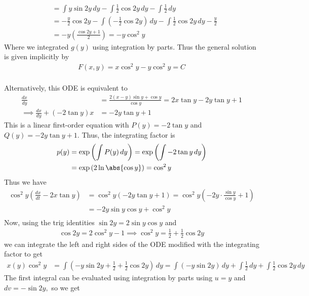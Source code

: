 \documentclass{article}
\begin{document}
\begin{enumerate}
\begin{soln}
\begin{align*}
				&= \int y\sin 2y\, dy - \int \frac{1}{2}\cos 2y\, dy - \int \frac{1}{2}\, dy \\
				&= -\frac{y}{2}\cos 2y - \int \left( -\frac{1}{2}\cos 2y \right)\, dy - \int \frac{1}{2}\cos 2y\, dy - \frac{y}{2} \\
				&= -y\left( \frac{\cos 2y + 1}{2} \right) = -y\cos^2 y
			\end{align*}
			Where we integrated $g(y)$ using integration by parts. Thus the general solution is given implicitly by
			\begin{align*}
				F(x, y) = \boxed{x\cos^2y - y\cos^2y = C} \\
			\end{align*}
			
			Alternatively, this ODE is equivalent to
			\begin{align*}
				\frac{dx}{dy} &= \frac{2(x-y)\sin y + \cos y}{\cos y} = 2x\tan y - 2y\tan y + 1 \\
				\implies \frac{dx}{dy} + (-2\tan y) x &= -2y\tan y + 1
			\end{align*}
			This is a linear first-order equation with $P(y)=-2\tan y$ and $Q(y) = -2y\tan y + 1.$ Thus, the integrating factor is
			\begin{align*}
				p(y) &= \exp\left( \int P(y)\, dy \right) = \exp\left( \int -2\tan y\, dy \right) \\ 
				&= \exp\left( 2\ln\abs{\cos y} \right)= \cos^2 y
			\end{align*}
			Thus we have
			\begin{align*}
				\cos^2 y \left( \frac{dx}{dt} -2x\tan y \right) &= \cos^2y \left( -2y\tan y+ 1 \right) = \cos^2y \left( -2y\cdot \frac{\sin y}{\cos y} + 1 \right) \\
				&= -2y\sin y\cos y + \cos^2y \\
			\end{align*}
			Now, using the trig identities $\sin 2y = 2\sin y\cos y$ and
			\begin{align*}
				\cos 2y = 2\cos^2y - 1 \implies \cos^2y = \frac{1}{2} + \frac{1}{2}\cos 2y
			\end{align*}
			we can integrate the left and right sides of the ODE modified with the integrating factor to get
			\begin{align*}
				x(y) \cos^2y &= \int\left( -y\sin 2y + \frac{1}{2} + \frac{1}{2}\cos 2y \right)\, dy = \int\left( -y\sin 2y \right)\, dy + \int \frac{1}{2}\, dy + \int \frac{1}{2}\cos 2y\, dy
			\end{align*}
			The first integral can be evaluated using integration by parts using $u=y$ and $dv=-\sin 2y,$ so we get 

\end{soln}
\end{enumerate}
\end{document}
